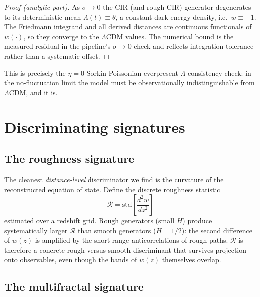 \documentclass[11pt,a4paper]{article}
\begin{document}
\begin{proof}[Proof (analytic part)]
As $\sigma\to0$ the CIR (and rough-CIR) generator degenerates to its deterministic mean $\Lambda(t)\equiv\theta$, a constant dark-energy density, i.e.\ $w\equiv-1$. The Friedmann integrand and all derived distances are continuous functionals of $w(\cdot)$, so they converge to the $\Lambda$CDM values. The numerical bound is the measured residual in the pipeline's $\sigma\to0$ check and reflects integration tolerance rather than a systematic offset.
\end{proof}

This is precisely the $\eta=0$ Sorkin-Poissonian everpresent-$\Lambda$ consistency check: in the no-fluctuation limit the model must be observationally indistinguishable from $\Lambda$CDM, and it is.

\section{Discriminating signatures}

\subsection{The roughness signature}

The cleanest \emph{distance-level} discriminator we find is the curvature of the reconstructed equation of state. Define the discrete roughness statistic
\begin{equation}
\mathcal{R} = \mathrm{std}\!\left[\frac{d^2 w}{dz^2}\right]
\end{equation}
estimated over a redshift grid. Rough generators (small $H$) produce systematically larger $\mathcal{R}$ than smooth generators ($H=1/2$): the second difference of $w(z)$ is amplified by the short-range anticorrelations of rough paths. $\mathcal{R}$ is therefore a concrete rough-versus-smooth discriminant that survives projection onto observables, even though the bands of $w(z)$ themselves overlap.

\subsection{The multifractal signature}
\label{sec:multifractal}
\end{document}

